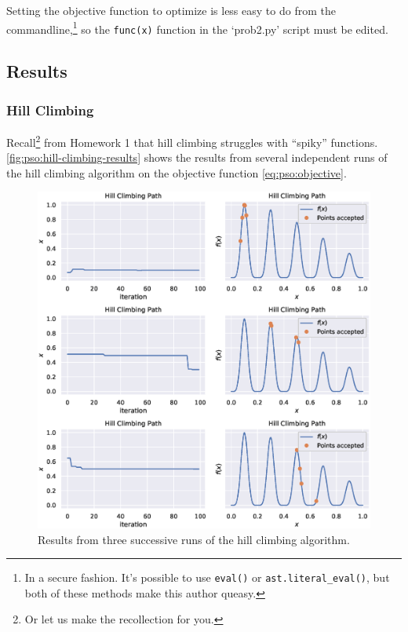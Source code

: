 \documentclass[12pt]{article}
\begin{document}
Setting the objective function to optimize is less easy to do from the commandline,\footnote{In a secure fashion. It's possible to use \texttt{eval()} or \texttt{ast.literal_eval()}, but both of these methods make this author queasy.}
so the \texttt{func(x)} function in the `prob2.py' script must be edited.

\subsection{Results}
\subsubsection{Hill Climbing}
Recall\footnote{Or let us make the recollection for you.} from Homework 1 that hill climbing struggles with ``spiky'' functions.
\autoref{fig:pso:hill-climbing-results} shows the results from several independent runs of the hill climbing algorithm on the objective function \autoref{eq:pso:objective}.

\begin{figure}[H]
    \centering
    \includegraphics[width=\textwidth]{figures/pso/prob1-hill-climbing-results.eps}
    \caption{Results from three successive runs of the hill climbing algorithm.}\label{fig:pso:hill-climbing-results}
\end{figure}
\end{document}
